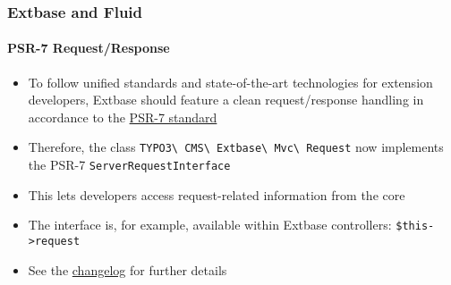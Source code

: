 %

\begin{frame}[fragile]
	\frametitle{Extbase and Fluid}
	\framesubtitle{PSR-7 Request/Response}

	\begin{itemize}
		\item To follow unified standards and state-of-the-art technologies for
			extension developers, Extbase should feature a clean request/response
			handling in accordance to the
			\href{https://www.php-fig.org/psr/psr-7/}{PSR-7 standard}
		\item Therefore, the class
			\small\texttt{TYPO3\textbackslash
				CMS\textbackslash
				Extbase\textbackslash
				Mvc\textbackslash
				Request}\normalsize\newline
			now implements the PSR-7
			\texttt{ServerRequestInterface}
		\item This lets developers access request-related information from the core
		\item The interface is, for example, available within Extbase controllers:\newline
			\texttt{\$this->request}
		\item See the
			\href{https://docs.typo3.org/c/typo3/cms-core/master/en-us/Changelog/11.3/Feature-94428-ExtbaseRequestImplementsServerRequestInterface.html}{changelog}
			for further details
	\end{itemize}

\end{frame}

